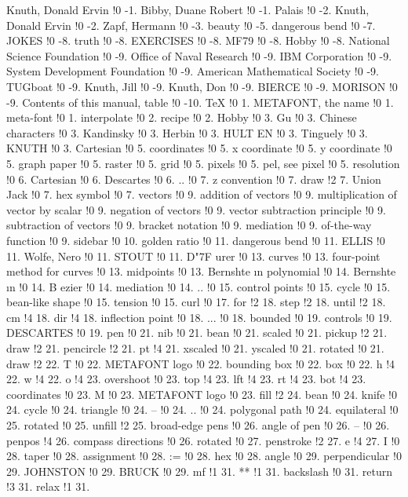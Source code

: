 Knuth, Donald Ervin !0 -1.
Bibby, Duane Robert !0 -1.
Palais !0 -2.
Knuth, Donald Ervin !0 -2.
Zapf, Hermann !0 -3.
beauty !0 -5.
dangerous bend !0 -7.
JOKES !0 -8.
truth !0 -8.
EXERCISES !0 -8.
MF79 !0 -8.
Hobby !0 -8.
National Science Foundation !0 -9.
Office of Naval Research !0 -9.
IBM Corporation !0 -9.
System Development Foundation !0 -9.
American Mathematical Society !0 -9.
TUGboat !0 -9.
Knuth, Jill !0 -9.
Knuth, Don !0 -9.
BIERCE !0 -9.
MORISON !0 -9.
Contents of this manual, table !0 -10.
TeX !0 1.
METAFONT, the name !0 1.
meta-font !0 1.
interpolate !0 2.
recipe !0 2.
Hobby !0 3.
Gu !0 3.
Chinese characters !0 3.
Kandinsky !0 3.
Herbin !0 3.
HULT{ E}N !0 3.
Tinguely !0 3.
KNUTH !0 3.
Cartesian !0 5.
coordinates !0 5.
x coordinate !0 5.
y coordinate !0 5.
graph paper !0 5.
raster !0 5.
grid !0 5.
pixels !0 5.
pel, see pixel !0 5.
resolution !0 6.
Cartesian !0 6.
Descartes !0 6.
.. !0 7.
z convention !0 7.
draw !2 7.
Union Jack !0 7.
hex symbol !0 7.
vectors !0 9.
addition of vectors !0 9.
multiplication of vector by scalar !0 9.
negation of vectors !0 9.
vector subtraction principle !0 9.
subtraction of vectors !0 9.
bracket notation !0 9.
mediation !0 9.
of-the-way function !0 9.
sidebar !0 10.
golden ratio !0 11.
dangerous bend !0 11.
ELLIS !0 11.
Wolfe, Nero !0 11.
STOUT !0 11.
D{\accent "7F u}rer !0 13.
curves !0 13.
four-point method for curves !0 13.
midpoints !0 13.
Bernshte{{ \i }}n polynomial !0 14.
Bernshte{{ \i }}n !0 14.
B{ e}zier !0 14.
mediation !0 14.
.. !0 15.
control points !0 15.
cycle !0 15.
bean-like shape !0 15.
tension !0 15.
curl !0 17.
for !2 18.
step !2 18.
until !2 18.
cm !4 18.
dir !4 18.
inflection point !0 18.
... !0 18.
bounded !0 19.
controls !0 19.
DESCARTES !0 19.
pen !0 21.
nib !0 21.
bean !0 21.
scaled !0 21.
pickup !2 21.
draw !2 21.
pencircle !2 21.
pt !4 21.
xscaled !0 21.
yscaled !0 21.
rotated !0 21.
draw !2 22.
T !0 22.
METAFONT logo !0 22.
bounding box !0 22.
box !0 22.
h !4 22.
w !4 22.
o !4 23.
overshoot !0 23.
top !4 23.
lft !4 23.
rt !4 23.
bot !4 23.
coordinates !0 23.
M !0 23.
METAFONT logo !0 23.
fill !2 24.
bean !0 24.
knife !0 24.
cycle !0 24.
triangle !0 24.
-- !0 24.
.. !0 24.
polygonal path !0 24.
equilateral !0 25.
rotated !0 25.
unfill !2 25.
broad-edge pens !0 26.
angle of pen !0 26.
-- !0 26.
penpos !4 26.
compass directions !0 26.
rotated !0 27.
penstroke !2 27.
e !4 27.
I !0 28.
taper !0 28.
assignment !0 28.
:= !0 28.
hex !0 28.
angle !0 29.
perpendicular !0 29.
JOHNSTON !0 29.
BRUCK !0 29.
mf !1 31.
** !1 31.
backslash !0 31.
return !3 31.
relax !1 31.
